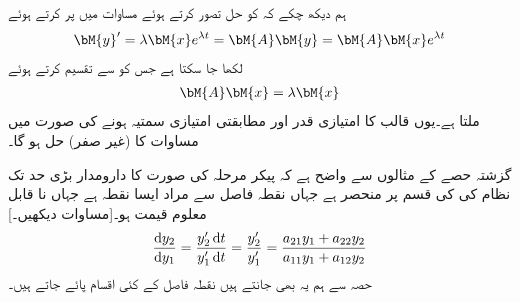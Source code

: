 ہم دیکھ چکے کہ  کو حل تصور کرتے ہوئے مساوات  میں پر کرتے ہوئے
\begin{align*}
\bM{y}'=\lambda \bM{x}e^{\lambda t}=\bM{A}\bM{y}=\bM{A}\bM{x}e^{\lambda t}
\end{align*}
لکھا جا سکتا ہے جس کو  سے تقسیم کرتے ہوئے
\begin{align}\label{مساوات_نظام_جانچ_نقطہ_فاصل_ب}
\bM{A}\bM{x}=\lambda \bM{x}
\end{align}
ملتا ہے۔یوں  قالب   کا امتیازی قدر اور  مطابقتی امتیازی سمتیہ ہونے کی صورت میں   مساوات  کا (غیر صفر) حل ہو گا۔

گزشتہ حصے کے مثالوں سے واضح ہے کہ پیکر مرحلہ کی صورت کا دارومدار بڑی حد تک نظام  کی  کی قسم پر منحصر ہے جہاں نقطہ فاصل سے مراد ایسا نقطہ ہے جہاں  نا قابل معلوم قیمت  ہو۔[مساوات  دیکھیں۔]
\begin{align}\label{مساوات_نظام_جانچ_نقطہ_فاصل_پ}
\frac{\dif y_2}{\dif y_1}=\frac{y_2' \dif t}{y_1'\dif t}=\frac{y_2'}{y_1'}=\frac{a_{21}y_1+a_{22}y_2}{a_{11}y_1+a_{12}y_2}
\end{align}
حصہ   سے ہم یہ بھی جانتے ہیں نقطہ فاصل کے کئی اقسام پائے جاتے ہیں۔

